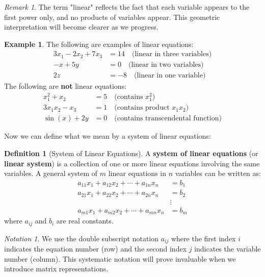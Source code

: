 \documentclass[12pt]{article}
\numberwithin{equation}{section}
\theoremstyle{plain}
\theoremstyle{definition}
\newtheorem{definition}[theorem]{Definition}
\newtheorem{example}[theorem]{Example}
\theoremstyle{remark}
\newtheorem{remark}[theorem]{Remark}
\newtheorem{notation}[theorem]{Notation}
\begin{document}
\begin{remark}
The term "linear" reflects the fact that each variable appears to the first power only, and no products of variables appear. This geometric interpretation will become clearer as we progress.
\end{remark}

\begin{example}
The following are examples of linear equations:
\begin{align}
3x_1 - 2x_2 + 7x_3 &= 14 \quad \text{(linear in three variables)}\\
-x + 5y &= 0 \quad \text{(linear in two variables)}\\
2z &= -8 \quad \text{(linear in one variable)}
\end{align}
The following are \textbf{not} linear equations:
\begin{align}
x_1^2 + x_2 &= 5 \quad \text{(contains } x_1^2\text{)}\\
3x_1 x_2 - x_3 &= 1 \quad \text{(contains product } x_1 x_2\text{)}\\
\sin(x) + 2y &= 0 \quad \text{(contains transcendental function)}
\end{align}
\end{example}

Now we can define what we mean by a system of linear equations:

\begin{definition}[System of Linear Equations]
A \textbf{system of linear equations} (or \textbf{linear system}) is a collection of one or more linear equations involving the same variables. A general system of $m$ linear equations in $n$ variables can be written as:
\begin{align}
a_{11}x_1 + a_{12}x_2 + \cdots + a_{1n}x_n &= b_1\\
a_{21}x_1 + a_{22}x_2 + \cdots + a_{2n}x_n &= b_2\\
&\vdots\\
a_{m1}x_1 + a_{m2}x_2 + \cdots + a_{mn}x_n &= b_m
\end{align}
where $a_{ij}$ and $b_i$ are real constants.
\end{definition}

\begin{notation}
We use the double subscript notation $a_{ij}$ where the first index $i$ indicates the equation number (row) and the second index $j$ indicates the variable number (column). This systematic notation will prove invaluable when we introduce matrix representations.
\end{notation}
\end{document}
